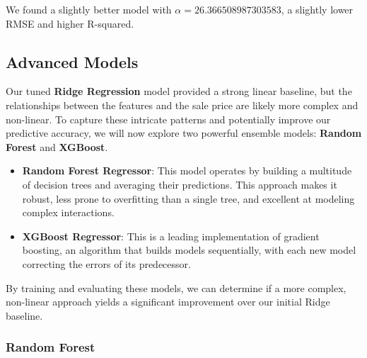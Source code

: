 \documentclass[11pt]{article}
\begin{document}
    We found a slightly better model with \(\alpha=26.366508987303583\), a
slightly lower RMSE and higher R-squared.

    \subsection{Advanced Models}\label{advanced-models}

    Our tuned \textbf{Ridge Regression} model provided a strong linear
baseline, but the relationships between the features and the sale price
are likely more complex and non-linear. To capture these intricate
patterns and potentially improve our predictive accuracy, we will now
explore two powerful ensemble models: \textbf{Random Forest} and
\textbf{XGBoost}.

\begin{itemize}
\item
  \textbf{Random Forest Regressor}: This model operates by building a
  multitude of decision trees and averaging their predictions. This
  approach makes it robust, less prone to overfitting than a single
  tree, and excellent at modeling complex interactions.
\item
  \textbf{XGBoost Regressor}: This is a leading implementation of
  gradient boosting, an algorithm that builds models sequentially, with
  each new model correcting the errors of its predecessor.
\end{itemize}

By training and evaluating these models, we can determine if a more
complex, non-linear approach yields a significant improvement over our
initial Ridge baseline.

    \subsubsection{Random Forest}\label{random-forest}
\end{document}
